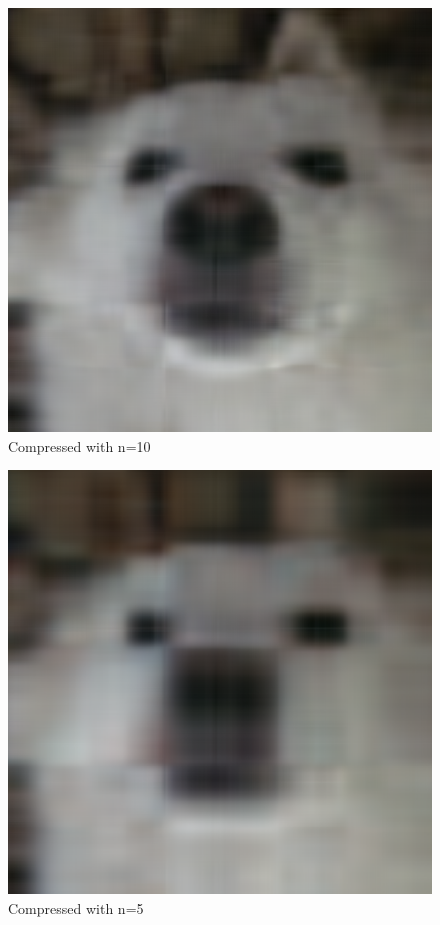 \documentclass{article}
\begin{document}
\begin{figure}[h]
    \includegraphics[scale=0.15]{lokip.jpg_svdt10.png}
    \centering
    \caption{Compressed with n=10}
\end{figure}

\begin{figure}[h]
    \includegraphics[scale=0.15]{lokip.jpg_svdt5.png}
    \centering
    \caption{Compressed with n=5}
\end{figure}
\end{document}
